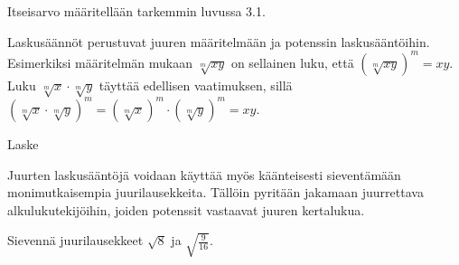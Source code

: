 Itseisarvo määritellään tarkemmin luvussa 3.1. %

Laskusäännöt perustuvat juuren määritelmään ja potenssin laskusääntöihin. Esimerkiksi määritelmän mukaan $\sqrt[m]{xy}$ on sellainen luku, että $\left( \sqrt[m]{xy} \right)^m = xy$. Luku $\sqrt[m]{x} \cdot \sqrt[m]{y}$ täyttää edellisen vaatimuksen, sillä $\left( \sqrt[m]{x} \cdot \sqrt[m]{y} \right)^m = \left( \sqrt[m]{x} \right)^m \cdot \left( \sqrt[m]{y} \right)^m = xy$.

\begin{esimerkki}
Laske

\begin{esimratk}
\end{esimratk}

\begin{esimvast}
\end{esimvast}
\end{esimerkki}

Juurten laskusääntöjä voidaan käyttää myös käänteisesti sieventämään monimutkaisempia juurilausekkeita. Tällöin pyritään jakamaan juurrettava alkulukutekijöihin, joiden potenssit vastaavat juuren kertalukua.

\begin{esimerkki}
Sievennä juurilausekkeet $\sqrt{8}$ ja $\sqrt{\frac{9}{16}}$. %

	\begin{esimratk}

	\end{esimratk}

\end{esimerkki}